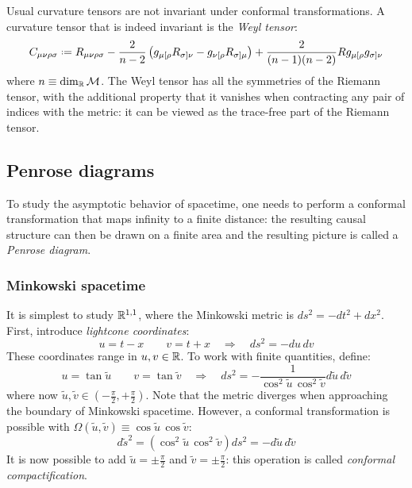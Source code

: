 Usual curvature tensors are not invariant under conformal transformations. A curvature tensor that is indeed invariant is the \textit{Weyl tensor}:
\begin{equation}
  C_{\mu \nu \rho \sigma} \defeq R_{\mu \nu \rho \sigma} - \frac{2}{n - 2} \left( g_{\mu [\rho} R_{\sigma] \nu} - g_{\nu [\rho} R_{\sigma] \mu} \right) + \frac{2}{(n-1)(n-2)} R g_{\mu [\rho} g_{\sigma] \nu}
  \label{eq:4.35}
\end{equation}
where $ n \equiv \dim_{\mathbb{R}}\mathcal{M} $. The Weyl tensor has all the symmetries of the Riemann tensor, with the additional property that it vanishes when contracting any pair of indices with the metric: it can be viewed as the trace-free part of the Riemann tensor.

\subsection{Penrose diagrams}

To study the asymptotic behavior of spacetime, one needs to perform a conformal transformation that maps infinity to a finite distance: the resulting causal structure can then be drawn on a finite area and the resulting picture is called a \textit{Penrose diagram}.

\subsubsection{Minkowski spacetime}
\label{sec-penr-mink}

It is simplest to study $ \mathbb{R}^{1,1} $, where the Minkowski metric is $ ds^2 = -dt^2 + dx^2 $. First, introduce \textit{lightcone coordinates}:
\begin{equation*}
  u = t - x
  \qquad
  v = t + x
  \quad \Rightarrow \quad
  ds^2 = - du\, dv
\end{equation*}
These coordinates range in $ u,v \in \mathbb{R} $. To work with finite quantities, define:
\begin{equation*}
  u = \tan \tilde{u}
  \qquad
  v = \tan \tilde{v}
  \quad \Rightarrow \quad
  ds^2 = - \frac{1}{\cos^2 \tilde{u}\, \cos^2 \tilde{v}} d\tilde{u}\, d\tilde{v}
\end{equation*}
where now $ \tilde{u},\tilde{v} \in \left( -\frac{\pi}{2}, +\frac{\pi}{2} \right) $. Note that the metric diverges when approaching the boundary of Minkowski spacetime. However, a conformal transformation is possible with $ \Omega(\tilde{u},\tilde{v}) \equiv \cos \tilde{u}\, \cos \tilde{v} $:
\begin{equation*}
  d\tilde{s}^2 = \left( \cos^2 \tilde{u}\, \cos^2 \tilde{v} \right) ds^2 = - d\tilde{u}\, d\tilde{v}
\end{equation*}
It is now possible to add $ \tilde{u} = \pm \frac{\pi}{2} $ and $ \tilde{v} = \pm \frac{\pi}{2} $: this operation is called \textit{conformal compactification}.

